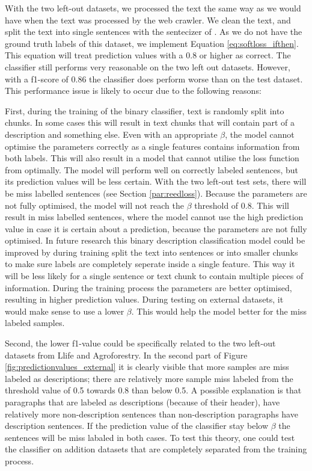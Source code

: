 \documentclass[a4paper, 12pt, oneside]{book} %
\begin{document}
With the two left-out datasets, we processed the text the same way as we would have when the text was processed by the web crawler. 
We clean the text, and split the text into single sentences with the sentecizer of \textcite{honnibal_spacy_2020}.
As we do not have the ground truth labels of this dataset, we implement Equation \ref{eq:softloss_ifthen}.
This equation will treat prediction values with a 0.8 or higher as correct.
The classifier still performs very reasonable on the two left out datasets.
However, with a f1-score of 0.86 the classifier does perform worse than on the test dataset.
This performance issue is likely to occur due to the following reasons:

First, during the training of the binary classifier, text is randomly split into chunks. 
In some cases this will result in text chunks that will contain part of a description and something else.
Even with an appropriate \(\beta\), the model cannot optimise the parameters correctly as a single features contains information from both labels.
This will also result in a model that cannot utilise the loss function from \textcite{reed_training_2015} optimally.
The model will perform well on correctly labeled sentences, but its prediction values will be less certain.
With the two left-out test sets, there will be miss labelled sentences (see Section \ref{par:reedloss}).
Because the parameters are not fully optimised, the model will not reach the \(\beta\) threshold of 0.8.
This will result in miss labelled sentences, where the model cannot use the high prediction value in case it is certain about a prediction, because the parameters are not fully optimised.
In future research this binary description classification model could be improved by during training split the text into sentences or into smaller chunks to make sure labels are completely seperate inside a single feature.
This way it will be less likely for a single sentence or text chunk to contain multiple pieces of information.
During the training process the parameters are better optimised, resulting in higher prediction values.
During testing on external datasets, it would make sense to use a lower \(\beta\).
This would help the model better for the miss labeled samples.

Second, the lower f1-value could be specifically related to the two left-out datasets from Llife and Agroforestry.
In the second part of Figure \ref{fig:predictionvalues_external} it is clearly visible that more samples are miss labeled as descriptions; there are relatively more sample miss labeled from the threshold value of 0.5 towards 0.8 than below 0.5.
A possible explanation is that paragraphs that are labeled as descriptions (because of their header), have relatively more non-description sentences than non-description paragraphs have description sentences.
If the prediction value of the classifier stay below \(\beta\) the sentences will be miss labaled in both cases.
To test this theory, one could test the classifier on addition datasets that are completely separated from the training process.
\end{document}
